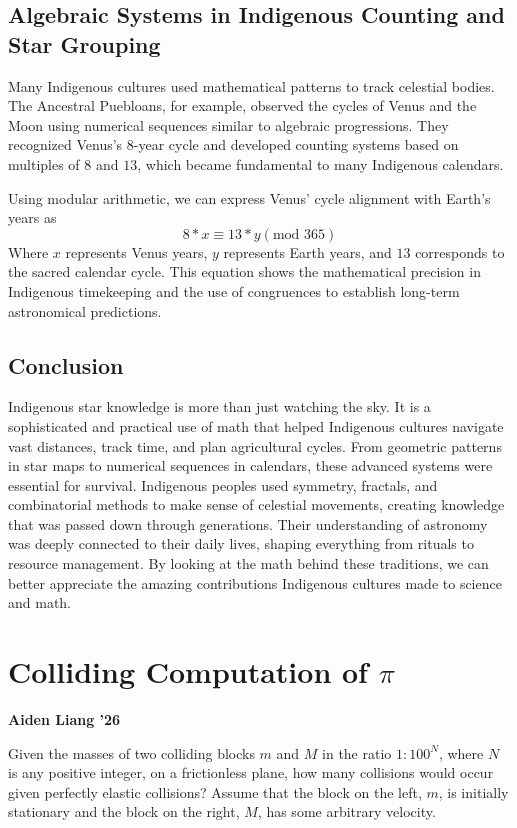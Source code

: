 \documentclass{article}
\begin{document}
\begin{multicols}{2}
\subsection*{Algebraic Systems in Indigenous Counting and Star Grouping}
Many Indigenous cultures used mathematical patterns to track celestial bodies. The Ancestral Puebloans, for example, observed the cycles of Venus and the Moon using numerical sequences similar to algebraic progressions. They recognized Venus’s $8$-year cycle and developed counting systems based on multiples of $8$ and $13$, which became fundamental to many Indigenous calendars.

Using modular arithmetic, we can express Venus’ cycle alignment with Earth’s years as
\begin{equation*}
    8 * x \equiv 13 * y (\text{mod } 365)
\end{equation*}
Where $x$ represents Venus years, $y$ represents Earth years, and $13$ corresponds to the sacred calendar cycle. This equation shows the mathematical precision in Indigenous timekeeping and the use of congruences to establish long-term astronomical predictions.

\subsection*{Conclusion}
Indigenous star knowledge is more than just watching the sky. It is a sophisticated and practical use of math that helped Indigenous cultures navigate vast distances, track time, and plan agricultural cycles. From geometric patterns in star maps to numerical sequences in calendars, these advanced systems were essential for survival. Indigenous peoples used symmetry, fractals, and combinatorial methods to make sense of celestial movements, creating knowledge that was passed down through generations. Their understanding of astronomy was deeply connected to their daily lives, shaping everything from rituals to resource management. By looking at the math behind these traditions, we can better appreciate the amazing contributions Indigenous cultures made to science and math.

\section*{Colliding Computation of $\pi$}
\noindent\textbf{Aiden Liang '26}
\medbreak

Given the masses of two colliding blocks $m$ and $M$ in the ratio $1:100^N$, where $N$ is any positive integer, on a frictionless plane, how many collisions would occur given perfectly elastic collisions? Assume that the block on the left, $m$, is initially stationary and the block on the right, $M$, has some arbitrary velocity.


\end{multicols}
\end{document}
